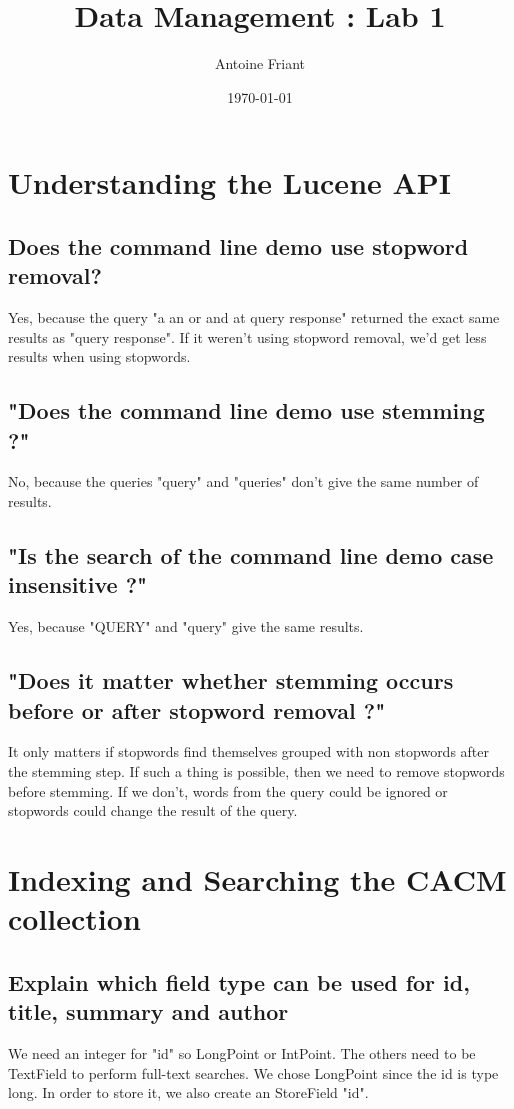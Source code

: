 \documentclass[11pt,a4paper,twoside,svgnames]{article}
\title{\color{DarkGreen}\huge\bfseries Data Management : Lab 1}
\author{Antoine Friant}
\date{\today}
\begin{document}
	
	\maketitle
	
	\section{Understanding the Lucene API}
	
	\subsection{Does the command line demo use stopword removal?}
	Yes, because the query "a an or and at query response" returned the exact same results as "query response". If it weren't using stopword removal, we'd get less results when using stopwords.
	
	\subsection{"Does the command line demo use stemming ?"}
	No, because the queries "query" and "queries" don't give the same number of results.
	
	\subsection{"Is the search of the command line demo case insensitive ?"}
	Yes, because "QUERY" and "query" give the same results.
	
	\subsection{"Does it matter whether stemming occurs before or after stopword removal ?"}
	It only matters if stopwords find themselves grouped with non stopwords after the stemming step. If such a thing is possible, then we need to remove stopwords before stemming. If we don't, words from the query could be ignored or stopwords could change the result of the query.
	
	\section{Indexing and Searching the CACM collection}
	\subsection{Explain which field type can be used for id, title, summary and author}
	We need an integer for "id" so LongPoint or IntPoint. The others need to be TextField to perform full-text searches. We chose LongPoint since the id is type long. In order to store it, we also create an StoreField "id".
	
\end{document}
